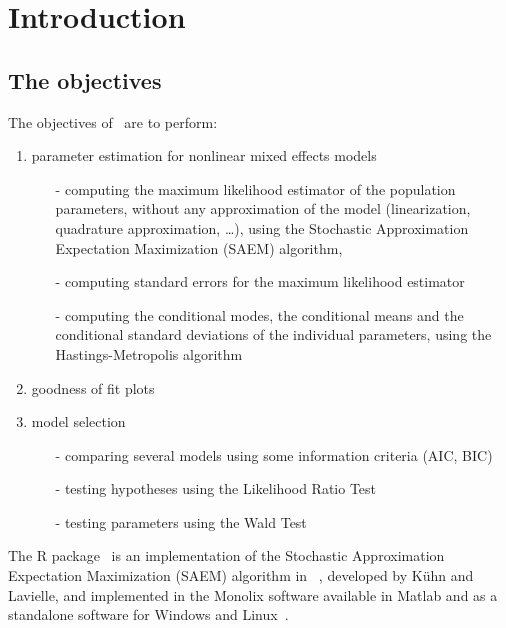 \chapter{Introduction} \label{chapter_introduction}


\section{The objectives}
The objectives of \monolix~are to perform:
\begin{enumerate}
\item parameter estimation for nonlinear mixed effects models
\begin{itemize}
\item[-] computing the maximum likelihood estimator of the population parameters, without any approximation of the model (linearization, quadrature approximation, \ldots), using the Stochastic Approximation Expectation Maximization (SAEM) algorithm,
\item[-] computing standard errors for the maximum likelihood estimator
\item[-] computing the conditional modes, the conditional means and the conditional standard deviations of the individual parameters, using the Hastings-Metropolis algorithm
\end{itemize}
\item goodness of fit plots
\item model selection
\begin{itemize}
\item[-] comparing several models using some information criteria (AIC, BIC)
\item[-] testing hypotheses using the Likelihood Ratio Test
\item[-] testing parameters using the Wald Test
\end{itemize}
\end{enumerate}
The R package \monolix~is an implementation of the Stochastic Approximation Expectation Maximization (SAEM) algorithm in \R~\cite{R}, developed by K\"uhn and Lavielle, and implemented in the {\sc Monolix} software available in Matlab and as a standalone software for Windows and Linux~\cite{MonolixUserGuide}.

